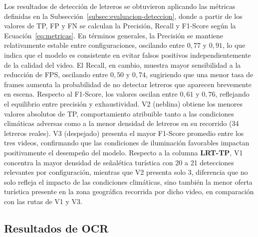 \documentclass[runningheads]{llncs}
\begin{document}
Los resultados de detección de letreros se obtuvieron aplicando las 
métricas definidas en la Subsección~\ref{subsec:evaluacion-deteccion}, 
donde a partir de los valores de TP, FP y FN se calculan la Precisión, 
Recall y F1-Score según la Ecuación~\ref{eq:metricas}. En términos generales, la Precisión se mantiene 
relativamente estable entre configuraciones, oscilando entre $0,77$ y 
$0,91$, lo que indica que el modelo es consistente en evitar falsos 
positivos independientemente de la calidad del video. El Recall, en 
cambio, muestra mayor sensibilidad a la reducción de FPS, oscilando 
entre $0,50$ y $0,74$, sugiriendo que una menor tasa de frames aumenta 
la probabilidad de no detectar letreros que aparecen brevemente en 
escena. Respecto al F1-Score, los valores oscilan entre $0,61$ y 
$0,76$, reflejando el equilibrio entre precisión y exhaustividad. 
V2 (neblina) obtiene los menores valores absolutos de TP, 
comportamiento atribuible tanto a las condiciones climáticas adversas 
como a la menor densidad de letreros en su recorrido (34 letreros 
reales). V3 (despejado) presenta el mayor F1-Score promedio entre los 
tres videos, confirmando que las condiciones de iluminación favorables 
impactan positivamente el desempeño del modelo. Respecto a la columna 
\textbf{LRT-TP}, V1 concentra la mayor densidad de señalética turística con 
20 a 21 detecciones relevantes por configuración, mientras que V2 
presenta solo 3, diferencia que no solo refleja el impacto de las 
condiciones climáticas, sino también la menor oferta turística presente 
en la zona geográfica recorrida por dicho video, en comparación con 
las rutas de V1 y V3.


\subsection{Resultados de OCR}
\label{subsec:resultados-ocr}
\end{document}
